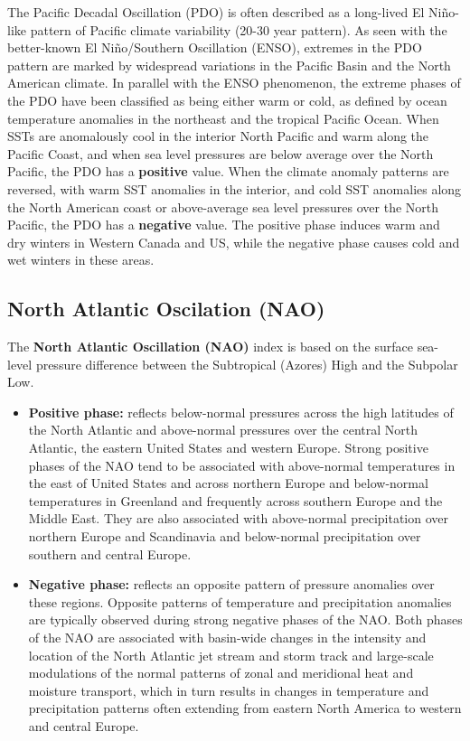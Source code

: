 \documentclass[12pt,oneside]{book}
\providecommand{\tightlist}{%
  \setlength{\itemsep}{0pt}\setlength{\parskip}{0pt}}
\begin{document}
The Pacific Decadal Oscillation (PDO) is often described as a long-lived
El Niño-like pattern of Pacific climate variability (20-30 year
pattern). As seen with the better-known El Niño/Southern Oscillation
(ENSO), extremes in the PDO pattern are marked by widespread variations
in the Pacific Basin and the North American climate. In parallel with
the ENSO phenomenon, the extreme phases of the PDO have been classified
as being either warm or cold, as defined by ocean temperature anomalies
in the northeast and the tropical Pacific Ocean. When SSTs are
anomalously cool in the interior North Pacific and warm along the
Pacific Coast, and when sea level pressures are below average over the
North Pacific, the PDO has a \textbf{positive} value. When the climate
anomaly patterns are reversed, with warm SST anomalies in the interior,
and cold SST anomalies along the North American coast or above-average
sea level pressures over the North Pacific, the PDO has a
\textbf{negative} value. The positive phase induces warm and dry winters
in Western Canada and US, while the negative phase causes cold and wet
winters in these areas.

\subsection{North Atlantic Oscilation
(NAO)}\label{north-atlantic-oscilation-nao}

The \textbf{North Atlantic Oscillation (NAO)} index is based on the
surface sea-level pressure difference between the Subtropical (Azores)
High and the Subpolar Low.

\begin{itemize}
\tightlist
\item
  \textbf{Positive phase:} reflects below-normal pressures across the
  high latitudes of the North Atlantic and above-normal pressures over
  the central North Atlantic, the eastern United States and western
  Europe. Strong positive phases of the NAO tend to be associated with
  above-normal temperatures in the east of United States and across
  northern Europe and below-normal temperatures in Greenland and
  frequently across southern Europe and the Middle East. They are also
  associated with above-normal precipitation over northern Europe and
  Scandinavia and below-normal precipitation over southern and central
  Europe.
\item
  \textbf{Negative phase:} reflects an opposite pattern of pressure
  anomalies over these regions. Opposite patterns of temperature and
  precipitation anomalies are typically observed during strong negative
  phases of the NAO. Both phases of the NAO are associated with
  basin-wide changes in the intensity and location of the North Atlantic
  jet stream and storm track and large-scale modulations of the normal
  patterns of zonal and meridional heat and moisture transport, which in
  turn results in changes in temperature and precipitation patterns
  often extending from eastern North America to western and central
  Europe.
\end{itemize}
\end{document}
